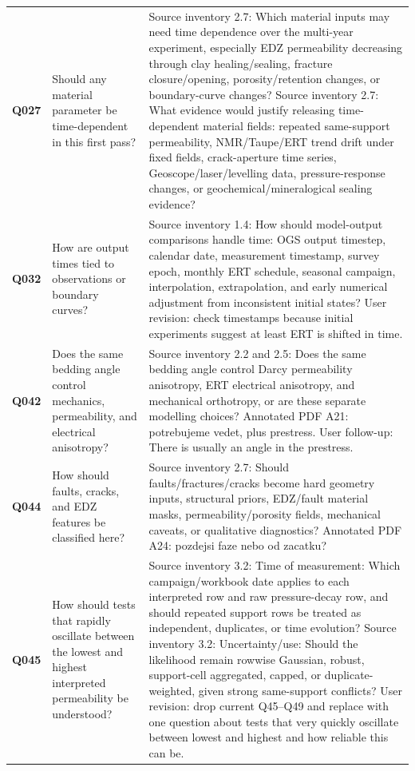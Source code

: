 \begin{longtable}{@{}L{0.10\textwidth} L{0.30\textwidth} L{0.52\textwidth}@{}}
\addlinespace[0.22em]
\textbf{Q027} & Should any material parameter be time-dependent in this first pass? & Source inventory 2.7: Which material inputs may need time dependence over the multi-year experiment, especially EDZ permeability decreasing through clay healing/sealing, fracture closure/opening, porosity/retention changes, or boundary-curve changes? Source inventory 2.7: What evidence would justify releasing time-dependent material fields: repeated same-support permeability, NMR/Taupe/ERT trend drift under fixed fields, crack-aperture time series, Geoscope/laser/levelling data, pressure-response changes, or geochemical/mineralogical sealing evidence?\\
\addlinespace[0.22em]
\textbf{Q032} & How are output times tied to observations or boundary curves? & Source inventory 1.4: How should model-output comparisons handle time: OGS output timestep, calendar date, measurement timestamp, survey epoch, monthly ERT schedule, seasonal campaign, interpolation, extrapolation, and early numerical adjustment from inconsistent initial states? User revision: check timestamps because initial experiments suggest at least ERT is shifted in time.\\
\addlinespace[0.22em]
\textbf{Q042} & Does the same bedding angle control mechanics, permeability, and electrical anisotropy? & Source inventory 2.2 and 2.5: Does the same bedding angle control Darcy permeability anisotropy, ERT electrical anisotropy, and mechanical orthotropy, or are these separate modelling choices? Annotated PDF A21: potrebujeme vedet, plus prestress. User follow-up: There is usually an angle in the prestress.\\
\addlinespace[0.22em]
\textbf{Q044} & How should faults, cracks, and EDZ features be classified here? & Source inventory 2.7: Should faults/fractures/cracks become hard geometry inputs, structural priors, EDZ/fault material masks, permeability/porosity fields, mechanical caveats, or qualitative diagnostics? Annotated PDF A24: pozdejsi faze nebo od zacatku?\\
\addlinespace[0.22em]
\textbf{Q045} & How should tests that rapidly oscillate between the lowest and highest interpreted permeability be understood? & Source inventory 3.2: Time of measurement: Which campaign/workbook date applies to each interpreted row and raw pressure-decay row, and should repeated support rows be treated as independent, duplicates, or time evolution? Source inventory 3.2: Uncertainty/use: Should the likelihood remain rowwise Gaussian, robust, support-cell aggregated, capped, or duplicate-weighted, given strong same-support conflicts? User revision: drop current Q45--Q49 and replace with one question about tests that very quickly oscillate between lowest and highest and how reliable this can be.\\

\end{longtable}
